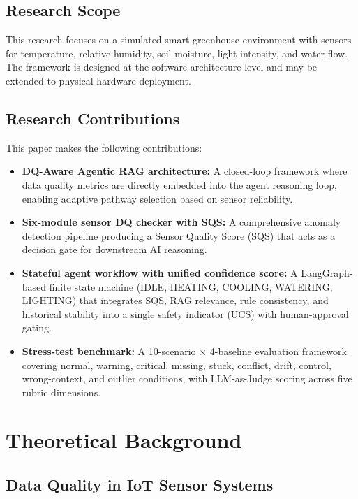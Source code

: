 \documentclass[runningheads]{llncs}
\begin{document}
\subsection{Research Scope}
This research focuses on a simulated smart greenhouse environment with sensors for temperature, relative humidity, soil moisture, light intensity, and water flow. The framework is designed at the software architecture level and may be extended to physical hardware deployment.

\subsection{Research Contributions}
This paper makes the following contributions:
\begin{itemize}
    \item \textbf{DQ-Aware Agentic RAG architecture:} A closed-loop framework where data quality metrics are directly embedded into the agent reasoning loop, enabling adaptive pathway selection based on sensor reliability.
    \item \textbf{Six-module sensor DQ checker with SQS:} A comprehensive anomaly detection pipeline producing a Sensor Quality Score (SQS) that acts as a decision gate for downstream AI reasoning.
    \item \textbf{Stateful agent workflow with unified confidence score:} A LangGraph-based finite state machine (IDLE, HEATING, COOLING, WATERING, LIGHTING) that integrates SQS, RAG relevance, rule consistency, and historical stability into a single safety indicator (UCS) with human-approval gating.
    \item \textbf{Stress-test benchmark:} A 10-scenario $\times$ 4-baseline evaluation framework covering normal, warning, critical, missing, stuck, conflict, drift, control, wrong-context, and outlier conditions, with LLM-as-Judge scoring across five rubric dimensions.
\end{itemize}

\section{Theoretical Background}

\subsection{Data Quality in IoT Sensor Systems}
\end{document}
